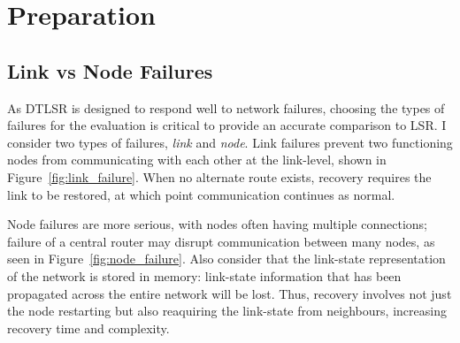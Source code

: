 \documentclass[withindex,glossary,openany]{cam-thesis}
\begin{document}
\chapter{Preparation}

\section{Link vs Node Failures}
\label{sec:link_vs_node_failures}

As DTLSR is designed to respond well to network failures, choosing the types of failures for the evaluation is critical to provide an accurate comparison to LSR. I consider two types of failures, \textit{link} and \textit{node}. Link failures prevent two functioning nodes from communicating with each other at the link-level, shown in Figure~\ref{fig:link_failure}. When no alternate route exists, recovery requires the link to be restored, at which point communication continues as normal.

Node failures are more serious, with nodes often having multiple connections; failure of a central router may disrupt communication between many nodes, as seen in Figure~\ref{fig:node_failure}. Also consider that the link-state representation of the network is stored in memory: link-state information that has been propagated across the entire network will be lost. Thus, recovery involves not just the node restarting but also reaquiring the link-state from neighbours, increasing recovery time and complexity.
\end{document}
